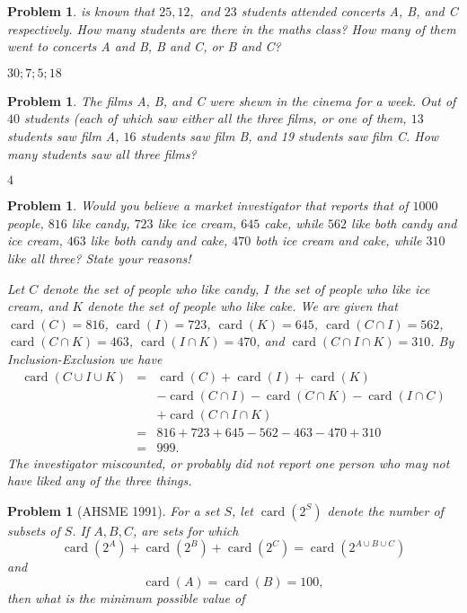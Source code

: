 \documentclass[11pt, openany]{book}
\theoremstyle{change} \theoremheaderfont{\blue\sffamily\bfseries}
\newtheorem{pro}[thm]{Problem}
\theoremstyle{nonumberplain} \theoremheaderfont{\sffamily\bfseries}
\newcommand{\í}{\'{\i}}
\def\card#1{\operatorname{card}\left(#1\right)}
\begin{document}
\begin{multicols}{2}
\begin{pro}
is known that $25, 12,$ and $23$ students attended concerts A, B,
and C respectively. How many students are there in the maths class?
How many of them went to concerts A and B, B and C, or B and C?
\begin{answer}$30; 7; 5; 18$
\end{answer}
      \end{pro}
   \begin{pro}
The films A, B, and C were shewn in the cinema for a week. Out of
$40$ students (each of which saw either all the three films, or one
of them, $13$ students saw film A, $16$ students saw film B, and 19
students saw film C. How many students saw all three films?
\begin{answer}$4$
\end{answer}
\end{pro}
\begin{pro}
Would you believe a market investigator that reports that of $1000$
people, $816$ like candy, $723$ like ice cream, $645$ cake, while
$562$ like both candy and ice cream, $463$ like both candy and cake,
$470$ both ice cream and cake, while $310$ like all three? State
your reasons! \begin{answer} Let $C$ denote the set of people who
like candy, $I$ the set of people who like ice cream, and $K$ denote
the set of people who like cake. We are given that $\card{C} = 816$,
$\card{I} = 723$, $\card{K} = 645$, $\card{C\cap I} = 562$,
$\card{C\cap K} = 463$, $\card{I\cap K} = 470$, and $\card{C\cap
I\cap K} = 310$. By Inclusion-Exclusion we have
$$\begin{array}{lll}
\card{C \cup I \cup K} & = & \card{C} + \card{I} + \card{K} \\ & & -
\card{C \cap I} - \card{C \cap K }
- \card{I \cap C} \\ & &  + \card{C \cap I \cap K} \\
& = & 816 + 723 + 645 - 562 - 463 - 470 + 310 \\ & = & 999.
\end{array}$$
The investigator miscounted, or probably did not report one person
who may not have liked any of the three things.
\end{answer}
\end{pro}
\begin{pro}[AHSME 1991]  For a set $S$, let $\card{2^S}$ denote the
number of subsets of $S$. If $A, B, C$, are sets for which $$
\card{2^A} + \card{2^B} + \card{2^C} = \card{2^{A\cup B\cup C}}$$and
$$\card{A} = \card{B} = 100,$$ then what is the minimum possible value of

\end{pro}
\end{multicols}
\end{document}
